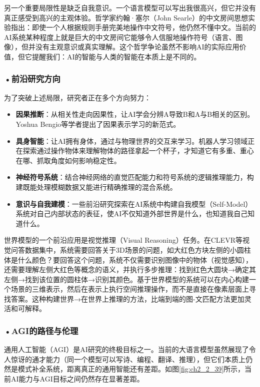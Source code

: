 另一个重要局限性是缺乏自我意识。一个语言模型可以写出我很高兴，但它并没有真正感受到高兴的主观体验。哲学家约翰·塞尔（John Searle）的中文房间思想实验指出：即使一个人根据规则手册完美地操作中文符号，他仍然不懂中文。当前的AI系统某种程度上就是巨大的中文房间它能够令人信服地操作符号（语言、图像），但并没有主观意识或真实理解。这个哲学争论虽然不影响AI的实际应用价值，但它提醒我们：AI的智能与人类的智能在本质上是不同的。

\subsubsection*{\textbf{•前沿研究方向}}

为了突破上述局限，研究者正在多个方向努力：
\begin{itemize}
\item \textbf{因果推断}：从相关性走向因果性，让AI学会分辨A导致B和A与B相关的区别。Yoshua Bengio等学者提出了因果表示学习的新范式。
\item \textbf{具身智能}：让AI拥有身体，通过与物理世界的交互来学习。机器人学习领域正在探索通过操作物体来理解物体的路径拿起一个杯子，才知道它有多重、重心在哪、抓取角度如何影响稳定性。
\item \textbf{神经符号系统}：结合神经网络的直觉匹配能力和符号系统的逻辑推理能力，构建既能处理模糊数据又能进行精确推理的混合系统。
\item \textbf{意识与自我建模}：一些前沿研究探索在AI系统中构建自我模型（Self-Model）系统对自己内部状态的表征，使AI不仅知道外部世界是什么，也知道我自己知道什么。
\end{itemize}

世界模型的一个前沿应用是视觉推理（Visual Reasoning）任务。在CLEVR等视觉问答数据集中，系统需要回答关于3D场景的问题，如大红色方块左侧的小圆柱体是什么颜色？要回答这个问题，系统不仅需要识别图像中的物体（视觉感知），还需要理解左侧大红色等概念的语义，并执行多步推理：找到红色大圆块→确定其左侧→找到该位置的圆柱体→识别其颜色。基于世界模型的系统可以在内心构建一个场景的三维表示，然后在表示上执行空间推理操作，而不是直接在像素层面上寻找答案。这种构建世界→在世界上推理的方法，比端到端的图-文匹配方法更加灵活和可解释。

\subsubsection*{\textbf{•AGI的路径与伦理}}

通用人工智能（AGI）是AI研究的终极目标之一。当前的大语言模型虽然展现了令人惊讶的通才能力（同一个模型可以写诗、编程、翻译、推理），但它们本质上仍然是模式补全系统，距离真正的通用智能还有差距。如图\ref{fig:ch2_2_39}所示，当前AI能力与AGI目标之间仍然存在显著差距。


